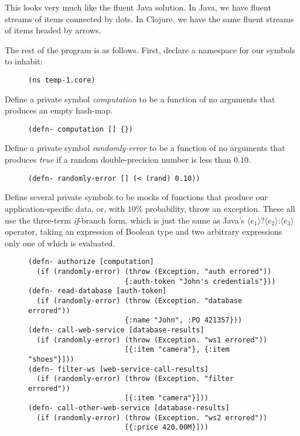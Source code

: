 \documentclass[11pt]{article}
\begin{document}
This looks very much like the fluent Java solution. In Java, we have
fluent streams of items connected by dots. In Clojure, we have the
same fluent streams of items headed by arrows.

The rest of the program is as follows. First, declare a namespace
for our symbols to inhabit:

\begin{figure}[H]
\label{functional-helpers-1}
\begin{verbatim}
(ns temp-1.core)
\end{verbatim}
\end{figure}

Define a private symbol \emph{computation} to be a function of no
arguments that produces an empty hash-map.

\begin{figure}[H]
\label{functional-helpers-2}
\begin{verbatim}
(defn- computation [] {})
\end{verbatim}
\end{figure}

Define a private symbol \emph{randomly-error} to be a function of no
arguments that produces \emph{true} if a random double-precision number
is less than $0.10$. 

\begin{figure}[H]
\label{functional-helpers-3}
\begin{verbatim}
(defn- randomly-error [] (< (rand) 0.10))
\end{verbatim}
\end{figure}

Define several private symbols to be mocks of functions that produce
our application-specific data, or, with $10\%$ probability, throw an
exception. These all use the three-term \emph{if}-branch form, which is
just the same as Java's
$\langle{}e_1\rangle{}\texttt{?}\langle{}e_2\rangle{}\texttt{:}\langle{}e_3\rangle{}$
operator, taking an expression of Boolean type and two arbitrary
expressions only one of which is evaluated.

\begin{figure}[H]
\label{functional-helpers-4}
\begin{verbatim}
(defn- authorize [computation]
  (if (randomly-error) (throw (Exception. "auth errored"))
                       {:auth-token "John's credentials"}))
(defn- read-database [auth-token]
  (if (randomly-error) (throw (Exception. "database errored"))
                       {:name "John", :PO 421357}))
(defn- call-web-service [database-results]
  (if (randomly-error) (throw (Exception. "ws1 errored"))
                       [{:item "camera"}, {:item "shoes"}]))
(defn- filter-ws [web-service-call-results]
  (if (randomly-error) (throw (Exception. "filter errored"))
                       [{:item "camera"}]))
(defn- call-other-web-service [database-results]
  (if (randomly-error) (throw (Exception. "ws2 errored"))
                       [{:price 420.00M}]))
\end{verbatim}
\end{figure}
\end{document}
